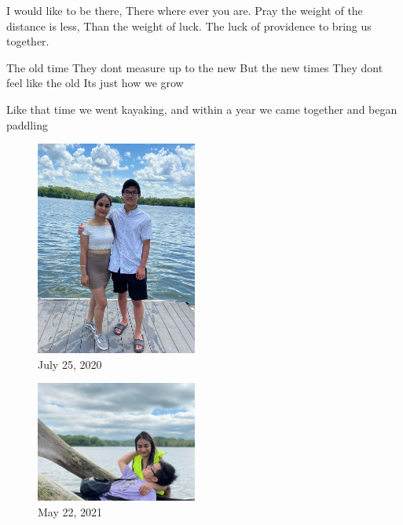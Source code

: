 \documentclass[
]{book}
\newenvironment{Shaded}{\begin{snugshade}}{\end{snugshade}}
\newcommand{\NormalTok}[1]{#1}
\newcommand{\StringTok}[1]{\textcolor[rgb]{0.31,0.60,0.02}{#1}}
\begin{document}
\begin{Shaded}
\begin{Highlighting}[]
\NormalTok{I would like to be there,}
\NormalTok{There where ever you are.}
\NormalTok{Pray the weight of the distance is less,}
\NormalTok{Than the weight of luck.}
\NormalTok{The luck of providence to bring us together.}

\NormalTok{The old time}
\NormalTok{They don}\StringTok{\textquotesingle{}t measure up to the new}
\StringTok{But the new times}
\StringTok{They don\textquotesingle{}}\NormalTok{t feel like the old}
\NormalTok{It}\StringTok{\textquotesingle{}s just how we grow}

\StringTok{Like that time }
\StringTok{we went kayaking,}
\StringTok{and within a year }
\StringTok{we came together }
\StringTok{and began paddling }
\end{Highlighting}
\end{Shaded}

\begin{figure}
\centering
\includegraphics[width=2.08333in,height=\textheight]{images/manjot kayak.jpg}
\caption{July 25, 2020}
\end{figure}

\begin{figure}
\centering
\includegraphics[width=2.08333in,height=\textheight]{mimages/9.1 5-22-2021.jpg}
\caption{May 22, 2021}
\end{figure}
\end{document}
